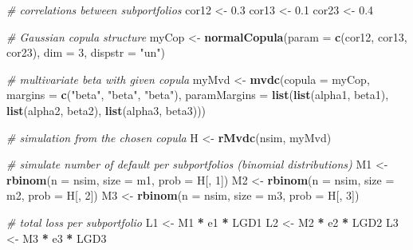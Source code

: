 \documentclass[
]{article}
\newenvironment{Shaded}{\begin{snugshade}}{\end{snugshade}}
\newcommand{\CommentTok}[1]{\textcolor[rgb]{0.56,0.35,0.01}{\textit{#1}}}
\newcommand{\DataTypeTok}[1]{\textcolor[rgb]{0.13,0.29,0.53}{#1}}
\newcommand{\DecValTok}[1]{\textcolor[rgb]{0.00,0.00,0.81}{#1}}
\newcommand{\FloatTok}[1]{\textcolor[rgb]{0.00,0.00,0.81}{#1}}
\newcommand{\KeywordTok}[1]{\textcolor[rgb]{0.13,0.29,0.53}{\textbf{#1}}}
\newcommand{\NormalTok}[1]{#1}
\newcommand{\OperatorTok}[1]{\textcolor[rgb]{0.81,0.36,0.00}{\textbf{#1}}}
\newcommand{\StringTok}[1]{\textcolor[rgb]{0.31,0.60,0.02}{#1}}
\begin{document}
\begin{Shaded}
\begin{Highlighting}[]
\CommentTok{# correlations between subportfolios}
\NormalTok{  cor12 <-}\StringTok{ }\FloatTok{0.3}
\NormalTok{  cor13 <-}\StringTok{ }\FloatTok{0.1}
\NormalTok{  cor23 <-}\StringTok{ }\FloatTok{0.4}
  
\CommentTok{# Gaussian copula structure}
\NormalTok{  myCop <-}\StringTok{ }\KeywordTok{normalCopula}\NormalTok{(}\DataTypeTok{param =} \KeywordTok{c}\NormalTok{(cor12, cor13, cor23), }\DataTypeTok{dim =} \DecValTok{3}\NormalTok{, }\DataTypeTok{dispstr =} \StringTok{"un"}\NormalTok{)}
  
\CommentTok{# multivariate beta with given copula}
\NormalTok{  myMvd <-}\StringTok{ }\KeywordTok{mvdc}\NormalTok{(}\DataTypeTok{copula =}\NormalTok{ myCop,}
                \DataTypeTok{margins =} \KeywordTok{c}\NormalTok{(}\StringTok{"beta"}\NormalTok{, }\StringTok{"beta"}\NormalTok{, }\StringTok{"beta"}\NormalTok{),}
                \DataTypeTok{paramMargins =} \KeywordTok{list}\NormalTok{(}\KeywordTok{list}\NormalTok{(alpha1, beta1),}
                                    \KeywordTok{list}\NormalTok{(alpha2, beta2),}
                                    \KeywordTok{list}\NormalTok{(alpha3, beta3)))}

\CommentTok{# simulation from the chosen copula}
\NormalTok{  H <-}\StringTok{ }\KeywordTok{rMvdc}\NormalTok{(nsim, myMvd)}
  
\CommentTok{# simulate number of default per subportfolios (binomial distributions)}
\NormalTok{  M1 <-}\StringTok{ }\KeywordTok{rbinom}\NormalTok{(}\DataTypeTok{n =}\NormalTok{ nsim, }\DataTypeTok{size =}\NormalTok{ m1, }\DataTypeTok{prob =}\NormalTok{ H[, }\DecValTok{1}\NormalTok{])}
\NormalTok{  M2 <-}\StringTok{ }\KeywordTok{rbinom}\NormalTok{(}\DataTypeTok{n =}\NormalTok{ nsim, }\DataTypeTok{size =}\NormalTok{ m2, }\DataTypeTok{prob =}\NormalTok{ H[, }\DecValTok{2}\NormalTok{])}
\NormalTok{  M3 <-}\StringTok{ }\KeywordTok{rbinom}\NormalTok{(}\DataTypeTok{n =}\NormalTok{ nsim, }\DataTypeTok{size =}\NormalTok{ m3, }\DataTypeTok{prob =}\NormalTok{ H[, }\DecValTok{3}\NormalTok{])}
  
\CommentTok{# total loss per subportfolio}
\NormalTok{  L1 <-}\StringTok{ }\NormalTok{M1 }\OperatorTok{*}\StringTok{ }\NormalTok{e1 }\OperatorTok{*}\StringTok{ }\NormalTok{LGD1}
\NormalTok{  L2 <-}\StringTok{ }\NormalTok{M2 }\OperatorTok{*}\StringTok{ }\NormalTok{e2 }\OperatorTok{*}\StringTok{ }\NormalTok{LGD2}
\NormalTok{  L3 <-}\StringTok{ }\NormalTok{M3 }\OperatorTok{*}\StringTok{ }\NormalTok{e3 }\OperatorTok{*}\StringTok{ }\NormalTok{LGD3}
  

\end{Highlighting}
\end{Shaded}
\end{document}
